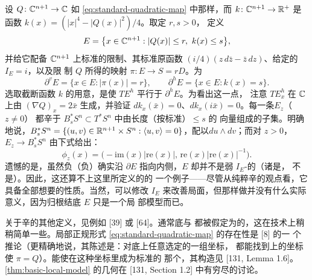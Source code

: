 \begin{example}\label{thm:basic-local-model}
设 $Q\colon\mathbb{C}^{n+1}\to\mathbb{C}$ 如 \eqref{eq:standard-quadratic-map} 中那样，而
$k\colon\mathbb{C}^{n+1}\to\mathbb{R}^+$ 是函数 $k(x)=(|x|^4-|Q(x)|^2)/4$。取定 $r,s>0$，
定义
\begin{equation}\label{eq:basic-model-domain}
E=\bigl\{x\in\mathbb{C}^{n+1} : |Q(x)|\le r,\ k(x)\le s\bigr\},
\end{equation}
并给它配备 $\mathbb{C}^{n+1}$ 上标准\trSymplecticForm{}的限制、其标准原函数
$(i/4)(z\,d\bar{z}-\bar{z}\,dz)$、给定的\trComplexStructure{}$I_E=i$，以及限
制 $Q$ 所得的映射 $\pi\colon E\to S=rD$。\trBoundaryFace{}为
\begin{equation*}
\partial^v E=\bigl\{x\in E : |\pi(x)|=r\bigr\},\qquad
\partial^h E=\bigl\{x\in E : k(x)=s\bigr\}.
\end{equation*}
选取截断函数 $k$ 的用意，是使 $TE^h$ 平行于 $\partial^h E$。为看出这一点，
注意 $TE^h_x$ 在 $\mathbb{C}$ 上由 $(\nabla Q)_x=2\bar{x}$ 生成，并验证
$dk_x(\bar{x})=0$、$dk_x(i\bar{x})=0$。每一条\trNonsingular\trFiber{}$E_z$（$z\neq 0$）
都辛\trIsomorphic{}于 $B_s^*S^n\subset T^*S^n$ 中由长度（按标准\trMetric）$\le s$ 的%
\trCotangent{}向量组成的子集。明确地说，$B_s^*S^n=\{(u,v)\in\mathbb{R}^{n+1}\times
S^n : \langle u,v\rangle=0\}$，配以\trSymplecticForm{}$du\wedge dv$；而对
$z>0$，\trIsomorphism{}$E_z\to B_s^*S^n$ 由下式给出：
\begin{equation*}
\phi_z(x)=\bigl(-\mathrm{im}(x)|\mathrm{re}(x)|,\,
\mathrm{re}(x)|\mathrm{re}(x)|^{-1}\bigr).
\end{equation*}
遗憾的是，虽然负\trLiouville{}（负\trRadial{}）\trVectorField{}确实沿
$\partial E$ 指向内侧，$E$ 却并不是弱 $I_E$-\trConvex{}的（诸\trFiber{}是，
\trTotalSpace{}不是）。因此，这还算不上这里所定义的\trExact\trLefschetzFibration{}的
一个例子——尽管从纯粹辛的观点看，它具备全部想要的性质。当然，可以修改
$I_E$ 来改善局面，但那样做并没有什么实际意义，因为归根结底 $E$ 只是一个局
部模型而已。
\end{example}
\begin{remark}\label{thm:other-lefschetz-definitions}
关于辛\trLefschetzFibration{}的其他定义，见例如 [39] 或 [64]。通常底与\trFiber{}
都被假定为\trClosed{}的，这在技术上稍稍简单一些。局部正规形式
\eqref{eq:standard-quadratic-map} 的存在性是\trHolomorphic\trMorseLemma{} [8] 的一
个推论（更精确地说，其陈述是：对底上任意选定的一组\trHolomorphic{}坐标，
都能找到\trTotalSpace{}上的坐标使 $\pi=Q$）。能使\trSymplecticStructure{}在这种坐标里成为标准的
那个\trDeformation，其构造见 [131, Lemma 1.6]。\cref{thm:basic-local-model}
的几何在 [131, Section 1.2] 中有穷尽的讨论。
\end{remark}
